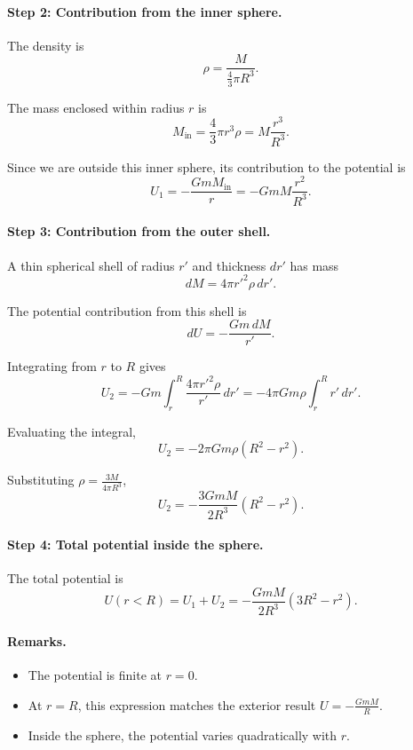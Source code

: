 \documentclass{article}
\begin{document}
\paragraph{Step 2: Contribution from the inner sphere.}

The density is
\[
\rho = \frac{M}{\frac{4}{3}\pi R^3}.
\]

The mass enclosed within radius $r$ is
\[
M_{\text{in}} = \frac{4}{3}\pi r^3 \rho = M \frac{r^3}{R^3}.
\]

Since we are outside this inner sphere, its contribution to the potential is
\[
U_1 = -\frac{G m M_{\text{in}}}{r}
= - G m M \frac{r^2}{R^3}.
\]

\paragraph{Step 3: Contribution from the outer shell.}

A thin spherical shell of radius $r'$ and thickness $dr'$ has mass
\[
dM = 4\pi r'^2 \rho \, dr'.
\]

The potential contribution from this shell is
\[
dU = -\frac{G m \, dM}{r'}.
\]

Integrating from $r$ to $R$ gives
\[
U_2 = -Gm \int_r^R \frac{4\pi r'^2 \rho}{r'} \, dr'
= -4\pi G m \rho \int_r^R r' \, dr'.
\]

Evaluating the integral,
\[
U_2 = -2\pi G m \rho (R^2 - r^2).
\]

Substituting $\rho = \frac{3M}{4\pi R^3}$,
\[
U_2 = -\frac{3 G m M}{2 R^3}(R^2 - r^2).
\]

\paragraph{Step 4: Total potential inside the sphere.}

The total potential is
\[
U(r<R) = U_1 + U_2
= -\frac{G m M}{2 R^3}(3R^2 - r^2).
\]

\paragraph{Remarks.}

\begin{itemize}
    \item The potential is finite at $r=0$.
    \item At $r=R$, this expression matches the exterior result $U = -\frac{G m M}{R}$.
    \item Inside the sphere, the potential varies quadratically with $r$.
\end{itemize}
\end{document}
